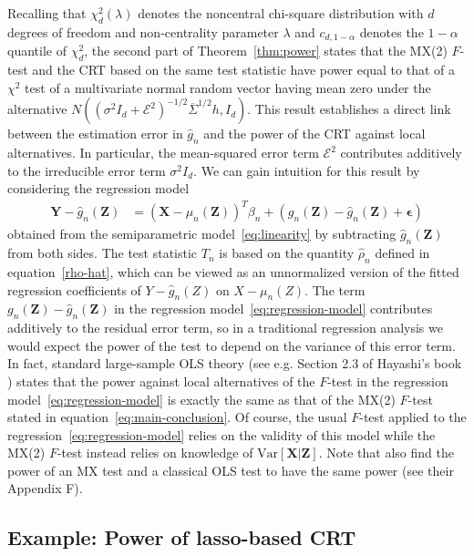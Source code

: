 \documentclass[12pt]{article}
\theoremstyle{definition}
\theoremstyle{remark}
\newcommand{\eps}{\epsilon}
\newcommand{\prx}{\bm X}
\newcommand{\srx}{X}
\newcommand{\prz}{\bm Z}
\newcommand{\srz}{Z}
\newcommand{\pry}{{\bm Y}}
\newcommand{\sry}{Y}
\begin{document}
Recalling that $\chi^2_d(\lambda)$ denotes the noncentral chi-square distribution with $d$ degrees of freedom and non-centrality parameter $\lambda$ and $c_{d,1-\alpha}$ denotes the $1-\alpha$ quantile of $\chi^2_d$, the second part of Theorem~\ref{thm:power} states that the MX(2) $F$-test and the CRT based on the same test statistic have power equal to that of a $\chi^2$ test of a multivariate normal random vector having mean zero under the alternative $N((\sigma^2I_d +\mathcal E^2)^{-1/2}\overline \Sigma^{1/2} h, I_d)$. This result establishes a direct link between the estimation error in $\widehat g_n$ and the power of the CRT against local alternatives. In particular, the mean-squared error term $\mathcal E^2$ contributes additively to the irreducible error term $\sigma^2 I_d$. We can gain intuition for this result by considering the regression model
\begin{equation}
\begin{split}
\pry - \widehat g_n(\prz) &= (\prx - \mu_n(\prz))^T\beta_n + (g_n(\prz) - \widehat g_n(\prz) + \bm \eps)
\label{eq:regression-model}
\end{split}
\end{equation}
obtained from the semiparametric model~\eqref{eq:linearity} by subtracting $\widehat g_n(\prz)$ from both sides. The test statistic $T_n$ is based on the quantity $\widehat \rho_n$ defined in equation~\eqref{rho-hat}, which can be viewed as an unnormalized version of the fitted regression coefficients of $\sry - \widehat g_n(\srz)$ on $\srx - \mu_n(\srz)$. The term $g_n(\prz) - \widehat g_n(\prz)$ in the regression model~\eqref{eq:regression-model} contributes additively to the residual error term, so in a traditional regression analysis we would expect the power of the test to depend on the variance of this error term. In fact, standard large-sample OLS theory (see e.g. Section 2.3 of Hayashi's book \cite{Hayashi2000}) states that the power against local alternatives of the $F$-test in the regression model~\eqref{eq:regression-model} is exactly the same as that of the MX(2) $F$-test stated in equation~\eqref{eq:main-conclusion}. Of course, the usual $F$-test applied to the regression~\eqref{eq:regression-model} relies on the validity of this model while the MX(2) $F$-test instead relies on knowledge of $\text{Var}[\prx|\prz]$. Note that \cite{Wang2020b} also find the power of an MX test and a classical OLS test to have the same power (see their Appendix F).

\subsection{Example: Power of lasso-based CRT}
\end{document}
